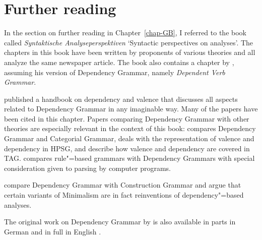 \section*{Further reading}

In the section on further reading in Chapter~\ref{chap-GB}, I referred to the book called
\emph{Syntaktische Analyseperspektiven} `Syntactic perspectives on analyses'. The chapters in this book have been written by proponents of various theories
and all analyze the same newspaper article. The book also contains a chapter by \citet{Engel2014a},
assuming his version of Dependency Grammar, namely \emph{Dependent Verb Grammar}.

\citet*{AEEHHL2003a-ed,AEEHHL2006a-ed} published a handbook on dependency and valence that discusses
all aspects related to Dependency Grammar in any imaginable way. Many of the papers have been cited
in this chapter. Papers comparing Dependency Grammar with other theories are especially relevant
in the context of this book: \citet{Lobin2003a} compares Dependency Grammar and
Categorial Grammar, \citet{Oliva2003a} deals with the representation of valence and dependency in
HPSG, and \citet*{BJR2003a-u} describe how valence and dependency are covered in
TAG. \citet{Hellwig2006a} compares rule"=based grammars with Dependency Grammars with special
consideration given to parsing by computer programs.

\citet{OG2012a-u} compare Dependency Grammar with Construction Grammar and \citet*{OPG2011a} argue
that certain variants of Minimalism are in fact reinventions of dependency"=based analyses.

The original work on Dependency Grammar by \citet{Tesniere59a-u} is also available in parts in German
\citep{Tesniere80a-u} and in full in English \citep{Tesniere2015a-u}.













